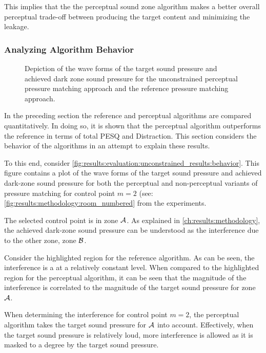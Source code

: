 This implies that the the perceptual sound zone algorithm makes a better overall perceptual trade-off between producing the target content 
and minimizing the leakage.

\subsubsection*{Analyzing Algorithm Behavior}
\begin{figure}[]
    \centering
    
    \caption{Depiction of the wave forms of the target sound pressure and achieved dark zone sound pressure for the 
        unconstrained perceptual pressure matching approach and the reference pressure matching approach.}
        \label{fig:results:evaluation:unconstrained_results:behavior}
\end{figure}

In the preceding section the reference and perceptual algorithms are compared quantitatively.
In doing so, it is shown that the perceptual algorithm outperforms the reference in terms of total PESQ and Distraction.
This section considers the behavior of the algorithms in an attempt to explain these results.

To this end, consider \autoref{fig:results:evaluation:unconstrained_results:behavior}.
This figure contains a plot of the wave forms of the target sound pressure and achieved dark-zone sound pressure for both the perceptual and non-perceptual
variants of pressure matching for control point $m=2$ (see: \autoref{fig:results:methodology:room_numbered} from the experiments.

The selected control point is in zone $\mathcal{A}$. 
As explained in \autoref{ch:results:methodology}, the achieved dark-zone sound pressure can be understood as the interference due to the other zone, zone $\mathcal{B}$.

Consider the highlighted region for the reference algorithm.
As can be seen, the interference is a at a relatively constant level.
When compared to the highlighted region for the perceptual algorithm, it can be seen that the magnitude of the interference is correlated to the
magnitude of the target sound pressure for zone $\mathcal{A}$.

When determining the interference for control point $m=2$, the perceptual algorithm takes the target sound pressure for $\mathcal{A}$ into account. 
Effectively, when the target sound pressure is relatively loud, more interference is allowed as it is masked to a degree by the target sound pressure.

